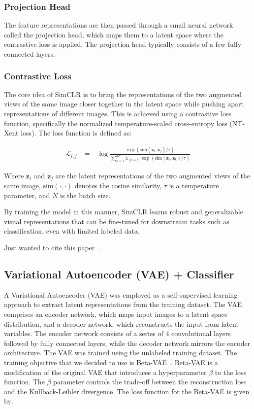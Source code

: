 \documentclass{article}
\begin{document}
\subsubsection{Projection Head}
The feature representations are then passed through a small neural network
called the projection head, which maps them to a latent space where the
contrastive loss is applied. The projection head typically consists of a few
fully connected layers.

\subsubsection{Contrastive Loss}
The core idea of SimCLR is to bring the representations of the two augmented
views of the same image closer together in the latent space while pushing apart
representations of different images. This is achieved using a contrastive loss
function, specifically the normalized temperature-scaled cross-entropy loss
(NT-Xent loss). The loss function is defined as:

\begin{align}
  \mathcal{L}_{i,j} & = -\log
  \frac{\exp(\text{sim}(\mathbf{z}_i, \mathbf{z}_j) / \tau)}{\sum_{k=1}^{2N}
  \mathbb{1}_{[k \neq i]} \exp(\text{sim}(\mathbf{z}_i, \mathbf{z}_k) / \tau)}
\end{align}

Where $\mathbf{z}_i$ and $\mathbf{z}_j$ are the latent representations of the
two augmented views of the same image, $\text{sim}(\cdot, \cdot)$ denotes the
cosine similarity, $\tau$ is a temperature parameter, and $N$ is the batch
size.

By training the model in this manner, SimCLR learns robust and generalizable
visual representations that can be fine-tuned for downstream tasks such as
classification, even with limited labeled data.

Just wanted to cite this paper~\cite{simclr}.

\subsection{Variational Autoencoder (VAE) + Classifier}

A Variational Autoencoder (VAE) was employed as a self-supervised learning
approach to extract latent representations from the training dataset. The VAE
comprises an encoder network, which maps input images to a latent space
distribution, and a decoder network, which reconstructs the input from latent
variables. The encoder network consists of a series of 4 convolutional layers
followed by fully connected layers, while the decoder network mirrors the
encoder architecture. The VAE was trained using the unlabeled training dataset.
The training objective that we decided to use is Beta-VAE~\cite{beta-vae}.
Beta-VAE is a modification of the original VAE that introduces a hyperparameter
$\beta$ to the loss function. The $\beta$ parameter controls the trade-off
between the reconstruction loss and the Kullback-Leibler divergence. The loss
function for the Beta-VAE is given by:
\end{document}
